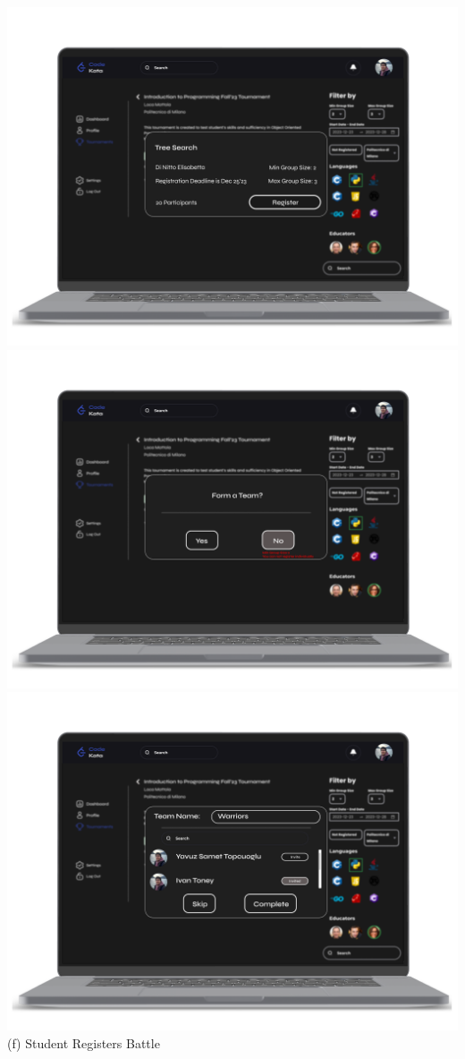 \newpage
\begin{center}
\includegraphics[scale=0.13]{Images/ui-ux/student_battle_register_1.png}
\includegraphics[scale=0.13]{Images/ui-ux/student_battle_register_2.png}
\includegraphics[scale=0.13]{Images/ui-ux/student_battle_register_3.png}
\\ (f) Student Registers Battle
\end{center}
